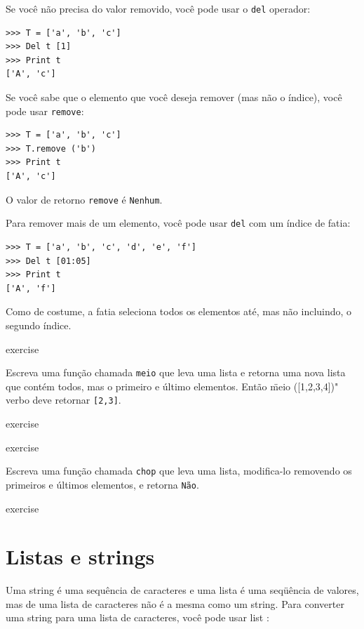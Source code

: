 \documentclass[10pt]{book}
\begin{document}
\begin{exercise}
Se você não precisa do valor removido, você pode usar o {\tt del}
operador:

\begin{verbatim}
>>> T = ['a', 'b', 'c']
>>> Del t [1]
>>> Print t
['A', 'c']
\end{verbatim}
%

Se você sabe que o elemento que você deseja remover (mas não o índice), você
pode usar {\tt remove}:

\begin{verbatim}
>>> T = ['a', 'b', 'c']
>>> T.remove ('b')
>>> Print t
['A', 'c']
\end{verbatim}
%
O valor de retorno {\tt remove} é {\tt Nenhum}.

Para remover mais de um elemento, você pode usar {\tt del} com
um índice de fatia:

\begin{verbatim}
>>> T = ['a', 'b', 'c', 'd', 'e', ​​'f']
>>> Del t [01:05]
>>> Print t
['A', 'f']
\end{verbatim}
%
Como de costume, a fatia seleciona todos os elementos até, mas não
incluindo, o segundo índice.

\begin{} exercise

Escreva uma função chamada \verb "meio" que leva uma lista e
retorna uma nova lista que contém todos, mas o primeiro e último
elementos. Então \"meio ([1,2,3,4])" verbo deve retornar \verb "[2,3]".

\end{} exercise

\begin{} exercise

Escreva uma função chamada \verb "chop" que leva uma lista, modifica-lo
removendo os primeiros e últimos elementos, e retorna {\tt Não}.

\end{} exercise


\section{Listas e strings}

Uma string é uma sequência de caracteres e uma lista é uma seqüência
de valores, mas de uma lista de caracteres não é a mesma como um
string. Para converter uma string para uma lista de caracteres,
você pode usar {list \tt}:


\end{exercise}
\end{document}
